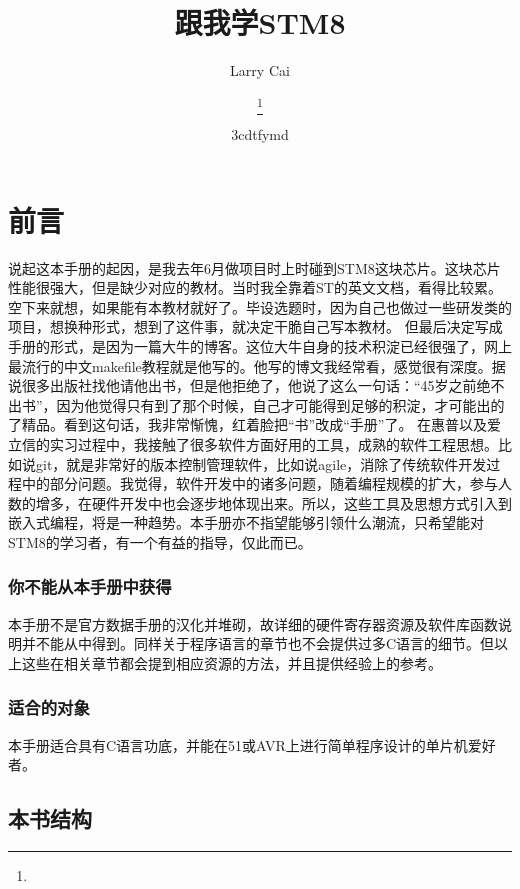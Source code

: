 \documentclass[a4paper]{book}
\title{{跟我学STM8}}
\author{Larry Cai}
\title{\huge{\savedtitle}}
\author{\textbf{\savedauthor}\thanks{}}
\date{\w3cdtfymd}
\begin{document}
\thispagestyle{empty}
\setcounter{tocdepth}{4}

\frontmatter
\chapter*{前言}

说起这本手册的起因，是我去年6月做项目时上时碰到STM8这块芯片。这块芯片性能很强大，但是缺少对应的教材。当时我全靠着ST的英文文档，看得比较累。空下来就想，如果能有本教材就好了。毕设选题时，因为自己也做过一些研发类的项目，想换种形式，想到了这件事，就决定干脆自己写本教材。 但最后决定写成手册的形式，是因为一篇大牛的博客。这位大牛自身的技术积淀已经很强了，网上最流行的中文makefile教程就是他写的。他写的博文我经常看，感觉很有深度。据说很多出版社找他请他出书，但是他拒绝了，他说了这么一句话：“45岁之前绝不出书”，因为他觉得只有到了那个时候，自己才可能得到足够的积淀，才可能出的了精品。看到这句话，我非常惭愧，红着脸把“书”改成“手册”了。 在惠普以及爱立信的实习过程中，我接触了很多软件方面好用的工具，成熟的软件工程思想。比如说git，就是非常好的版本控制管理软件，比如说agile，消除了传统软件开发过程中的部分问题。我觉得，软件开发中的诸多问题，随着编程规模的扩大，参与人数的增多，在硬件开发中也会逐步地体现出来。所以，这些工具及思想方式引入到嵌入式编程，将是一种趋势。本手册亦不指望能够引领什么潮流，只希望能对STM8的学习者，有一个有益的指导，仅此而已。

\subsection*{你不能从本手册中获得}

本手册不是官方数据手册的汉化并堆砌，故详细的硬件寄存器资源及软件库函数说明并不能从中得到。同样关于程序语言的章节也不会提供过多C语言的细节。但以上这些在相关章节都会提到相应资源的方法，并且提供经验上的参考。

\subsection*{适合的对象}

本手册适合具有C语言功底，并能在51或AVR上进行简单程序设计的单片机爱好者。

\section*{本书结构}
\end{document}
